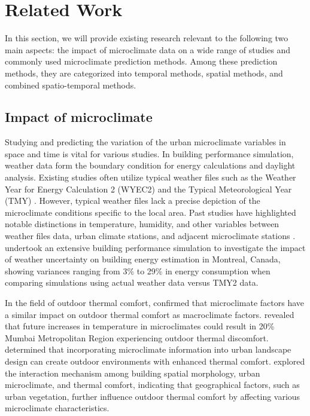 \documentclass[a4paper,fleqn]{cas-sc}
\begin{document}

\section{Related Work}\label{Related Work}

In this section, we will provide existing research relevant to the following two main aspects: the impact of microclimate data on a wide range of studies and commonly used microclimate prediction methods. Among these prediction methods, they are categorized into temporal methods, spatial methods, and combined spatio-temporal methods.

\subsection{Impact of microclimate}

Studying and predicting the variation of the urban microclimate variables in space and time is vital for various studies. In building performance simulation, weather data form the boundary condition for energy calculations and daylight analysis. Existing studies often utilize typical weather files such as the Weather Year for Energy Calculation 2 (WYEC2) and the Typical Meteorological Year (TMY) \citep{han2021using}. However, typical weather files lack a precise depiction of the microclimate conditions specific to the local area. Past studies have highlighted notable distinctions in temperature, humidity, and other variables between weather files data, urban climate stations, and adjacent microclimate stations \citep{wang2021benchmarking,lazos2014optimisation}. \cite{hosseini2017energy} undertook an extensive building performance simulation to investigate the impact of weather uncertainty on building energy estimation in Montreal, Canada, showing variances ranging from 3\% to 29\% in energy consumption when comparing simulations using actual weather data versus TMY2 data. 

In the field of outdoor thermal comfort, \citet{zhang2022assessment} confirmed that microclimate factors have a similar impact on outdoor thermal comfort as macroclimate factors. \citet{vinayak2022impacts} revealed that future increases in temperature in microclimates could result in 20\% Mumbai Metropolitan Region experiencing outdoor thermal discomfort. \cite{lin2021integrating} determined that incorporating microclimate information into urban landscape design can create outdoor environments with enhanced thermal comfort. \cite{zhang2022impact} explored the interaction mechanism among building spatial morphology, urban microclimate, and thermal comfort, indicating that geographical factors, such as urban vegetation, further influence outdoor thermal comfort by affecting various microclimate characteristics. 
\end{document}
